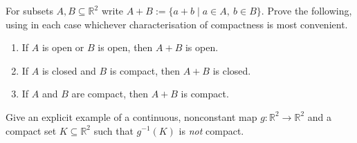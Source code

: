 \begin{exercise}
\label{ex:sumset_open_closed_compact}
For subsets $A, B \subseteq \mathbb{R}^2$ write $A + B := \{a+b \mid a \in A,\ b \in B\}$. Prove
the following, using in each case whichever characterisation of compactness is most convenient.
\begin{enumerate}[label=\textbf{(\alph*)}]
  \item If $A$ is open or $B$ is open, then $A+B$ is open.
  \item If $A$ is closed and $B$ is compact, then $A+B$ is closed.
  \item If $A$ and $B$ are compact, then $A+B$ is compact.
\end{enumerate}
\end{exercise}

\begin{exercise}
\label{ex:box_preimage_of_compact_not_compact}
Give an explicit example of a continuous, nonconstant map $g : \mathbb{R}^2 \to \mathbb{R}^2$ and
a compact set $K \subseteq \mathbb{R}^2$ such that $g^{-1}(K)$ is \emph{not} compact.
\end{exercise}

